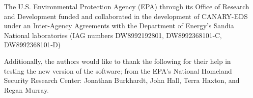 The U.S. Environmental Protection Agency (EPA) through its Office of Research and Development
funded and collaborated in the development of CANARY-EDS under an Inter-Agency Agreements
with the Department of Energy's Sandia National laboratories 
(IAG numbers DW8992192801, DW8992368101-C, DW8992368101-D)

Additionally, the authors would like to thank the following for their help in testing the new version of
the software; from the EPA's National Homeland Security Research Center: Jonathan Burkhardt,
John Hall, Terra Haxton, and Regan Murray.
